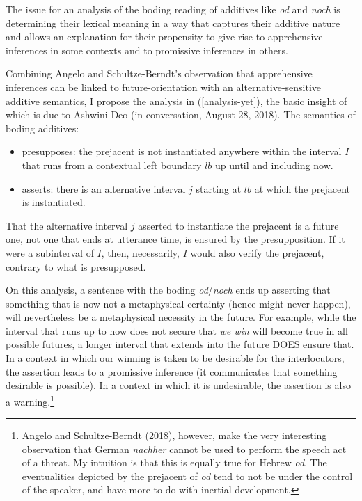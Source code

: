 \documentclass[output=paper,colorlinks,citecolor=brown]{langscibook}
\begin{document}
The issue for an analysis of the boding reading of additives like \textit{od} and \textit{noch} is determining their lexical meaning  in a way that captures their additive nature and allows an explanation for their propensity to give rise to apprehensive inferences in some contexts and to promissive inferences in others. 

Combining Angelo and Schultze-Berndt's observation that apprehensive inferences can be linked to future-orientation with an alternative-sensitive additive semantics, I propose the analysis in (\ref{analysis-yet}), the basic insight of which is due to Ashwini Deo (in conversation, August 28, 2018). 
\ea
\label{analysis-yet} \textnormal{The semantics of boding additives:}
\begin{itemize}\itemsep=-1mm
\item \textnormal{{\sc presupposes}: the prejacent is not instantiated anywhere within the interval $I$ that runs from a contextual left boundary $lb$ up until and including now.}  
\item \textnormal{{\sc asserts}: there is an alternative interval $j$ starting at $lb$ at which the prejacent is instantiated.} 
\end{itemize} 
\z

That the alternative interval $j$ asserted to instantiate the prejacent is a future one, not one that ends at utterance time, is ensured by the presupposition. If it were a subinterval of $I$, then, necessarily, $I$ would also verify the prejacent, contrary to what is presupposed. 

On this analysis, a sentence with the boding \textit{od}/\textit{noch} ends up asserting that something that is now not a metaphysical certainty (hence might never happen), will nevertheless be a metaphysical necessity in the future. For example, while the interval that runs up to now does not secure that \textit{we win} will become true in all possible futures, a longer interval that extends into the future DOES ensure that. In a context in which our winning is taken to be desirable for the interlocutors, the assertion leads to a promissive inference (it communicates that something desirable is possible). In a context in which it is undesirable, the assertion is also a warning.\footnote{Angelo and Schultze-Berndt (2018), however, make the very interesting observation that German \textit{nachher} cannot be used to perform the speech act of a threat. My intuition is that this is equally true for Hebrew \textit{od}. The eventualities depicted by the prejacent of \textit{od} tend to not be under the control of the speaker, and have more to do with inertial development.} 
\end{document}
